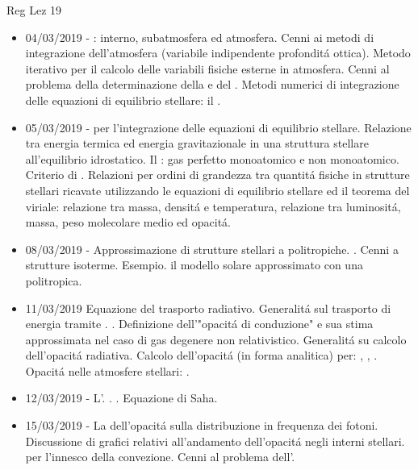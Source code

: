 \begin{frame}[allowframebreaks]{Reg Lez 19}
\begin{itemize}
\item 04/03/2019 - : interno, subatmosfera ed atmosfera. Cenni ai metodi di integrazione dell'atmosfera (variabile indipendente profondit\'a ottica). Metodo iterativo per il calcolo delle variabili fisiche esterne in atmosfera. Cenni al problema della determinazione della  e del . Metodi numerici di integrazione delle equazioni di equilibrio stellare: il . 
\item 05/03/2019 -  per l'integrazione delle equazioni di equilibrio stellare. Relazione tra energia termica ed energia gravitazionale in una struttura stellare all'equilibrio idrostatico. Il : gas perfetto monoatomico e non monoatomico. Criterio di . Relazioni per ordini di grandezza tra quantit\'a fisiche in strutture stellari ricavate utilizzando le equazioni di equilibrio stellare ed il teorema del viriale: relazione tra massa, densit\'a e temperatura, relazione tra luminosit\'a, massa, peso molecolare medio ed opacit\'a. 
\item 08/03/2019 - Approssimazione di strutture stellari a politropiche. . Cenni a strutture isoterme. Esempio. il modello solare approssimato con una politropica. 
\item 11/03/2019 Equazione del trasporto radiativo. Generalit\'a sul trasporto di energia tramite . . Definizione dell'"opacit\'a di conduzione" e sua stima approssimata nel caso di gas degenere non relativistico. Generalit\'a su calcolo dell'opacit\'a radiativa. Calcolo dell'opacit\'a (in forma analitica) per: , , . Opacit\'a nelle atmosfere stellari: . 
\item 12/03/2019 - L'. . . Equazione di Saha.
\item 15/03/2019 - La  dell'opacit\'a sulla distribuzione in frequenza dei fotoni. Discussione di grafici relativi all'andamento dell'opacit\'a negli interni stellari.  per l'innesco della convezione. Cenni al problema dell'.

\end{itemize}
\end{frame}
